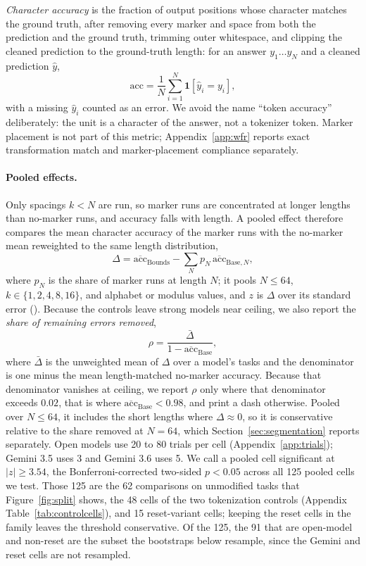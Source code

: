\documentclass[10pt]{article} %
\begin{document}
\emph{Character accuracy} is the fraction of output positions whose character matches the ground truth, after removing every marker and space from both the prediction and the ground truth, trimming outer whitespace, and clipping the cleaned prediction to the ground-truth length: for an answer $y_1 \dots y_N$ and a cleaned prediction $\hat y$,
\begin{equation}
\mathrm{acc} = \frac{1}{N} \sum_{i=1}^{N} \mathbf{1}\left[\hat y_i = y_i\right],
\label{eq:acc}
\end{equation}
with a missing $\hat y_i$ counted as an error. We avoid the name ``token accuracy'' deliberately: the unit is a character of the answer, not a tokenizer token. Marker placement is not part of this metric; Appendix~\ref{app:wfr} reports exact transformation match and marker-placement compliance separately.

\paragraph{Pooled effects.} Only spacings $k < N$ are run, so marker runs are concentrated at longer lengths than no-marker runs, and accuracy falls with length. A pooled effect therefore compares the mean character accuracy of the marker runs with the no-marker mean reweighted to the same length distribution,
\begin{equation}
\Delta = \overline{\mathrm{acc}}_{\text{Bounds}} - \sum_N p_N\, \overline{\mathrm{acc}}_{\text{Base},N},
\label{eq:delta}
\end{equation}
where $p_N$ is the share of marker runs at length $N$; it pools $N \le 64$, $k \in \{1, 2, 4, 8, 16\}$, and alphabet or modulus values, and $z$ is $\Delta$ over its standard error (). Because the controls leave strong models near ceiling, we also report the \emph{share of remaining errors removed},
\begin{equation}
\rho = \frac{\bar\Delta}{1 - \overline{\mathrm{acc}}_{\text{Base}}},
\label{eq:share}
\end{equation}
where $\bar\Delta$ is the unweighted mean of $\Delta$ over a model's tasks and the denominator is one minus the mean length-matched no-marker accuracy. Because that denominator vanishes at ceiling, we report $\rho$ only where that denominator exceeds $0.02$, that is where $\overline{\mathrm{acc}}_{\text{Base}} < 0.98$, and print a dash otherwise. Pooled over $N \le 64$, it includes the short lengths where $\Delta \approx 0$, so it is conservative relative to the share removed at $N = 64$, which Section~\ref{sec:segmentation} reports separately. Open models use 20 to 80 trials per cell (Appendix~\ref{app:trials}); Gemini 3.5 uses 3 and Gemini 3.6 uses 5. We call a pooled cell significant at $|z| \ge 3.54$, the Bonferroni-corrected two-sided $p < 0.05$ across all 125 pooled cells we test. Those 125 are the 62 comparisons on unmodified tasks that Figure~\ref{fig:split} shows, the 48 cells of the two tokenization controls (Appendix Table~\ref{tab:controlcells}), and 15 reset-variant cells; keeping the reset cells in the family leaves the threshold conservative. Of the 125, the 91 that are open-model and non-reset are the subset the bootstraps below resample, since the Gemini and reset cells are not resampled.
\end{document}
